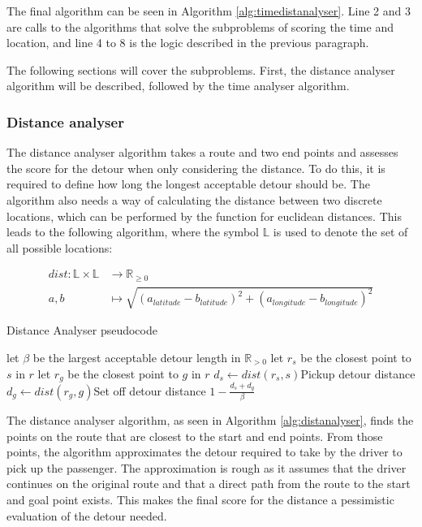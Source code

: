 The final algorithm can be seen in Algorithm \ref{alg:timedistanalyser}.
Line 2 and 3 are calls to the algorithms that solve the subproblems of scoring the time and location, and line 4 to 8 is the logic described in the previous paragraph.

The following sections will cover the subproblems.
First, the distance analyser algorithm will be described, followed by the time analyser algorithm.

\subsubsection{Distance analyser}
The distance analyser algorithm takes a route and two end points and assesses the score for the detour when only considering the distance.
To do this, it is required to define how long the longest acceptable detour should be.
The algorithm also needs a way of calculating the distance between two discrete locations, which can be performed by the function for euclidean distances.
This leads to the following algorithm, where the symbol $\mathbb{L}$ is used to denote the set of all possible locations:

\begin{align*}
	dist : \mathbb{L}\times\mathbb{L} &\rightarrow \mathbb{R}_{\geq 0}\\
	a, b &\mapsto \sqrt{(a_{latitude} - b_{latitude})^2 + (a_{longitude} - b_{longitude})^2}
\end{align*}

\begin{algorithm}
	\caption{Distance Analyser pseudocode}
	\label{alg:distanalyser}
	\begin{algorithmic}[1]
		\Require 
		\Statex let $\beta$ be the largest acceptable detour length in $\mathbb{R}_{>0}$ 
		\Statex 
			\State let $r_s$ be the closest point to $s$ in $r$
			\State let $r_g$ be the closest point to $g$ in $r$
			\State $d_s\gets dist(r_s, s)$\Comment Pickup detour distance
			\State $d_g\gets dist(r_g, g)$\Comment Set off detour distance
			\State\Return $1-\frac{d_s + d_g}{\beta}$
		\EndFunction
	\end{algorithmic}
\end{algorithm}

The distance analyser algorithm, as seen in Algorithm \ref{alg:distanalyser}, finds the points on the route that are closest to the start and end points.
From those points, the algorithm approximates the detour required to take by the driver to pick up the passenger.
The approximation is rough as it assumes that the driver continues on the original route and that a direct path from the route to the start and goal point exists.
This makes the final score for the distance a pessimistic evaluation of the detour needed.


